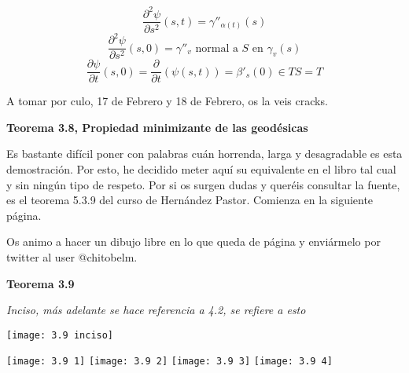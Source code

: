\documentclass[openany]{book}
\begin{document}
\begin{demonstration}
  $$ \dfrac{\partial ^2 \psi}{\partial s^2}(s,t) = \gamma ''_{\alpha (t)}(s)  $$
  $$ \dfrac{\partial ^2 \psi}{\partial s^2}(s,0) = \gamma ''_v \text{ normal a }S \text{ en } \gamma _v(s) $$
  $$ \dfrac{\partial \psi}{\partial t}(s,0) = \dfrac{\partial }{\partial t}\left( \psi(s,t) \right) = \beta '_s(0) \in TS=T   $$

  A tomar por culo, 17 de Febrero y 18 de Febrero, os la veis cracks.
\end{demonstration}

\begin{center}
\textbf{Teorema 3.8, Propiedad minimizante de las geodésicas}
\end{center}

Es bastante difícil poner con palabras cuán horrenda, larga y desagradable es esta demostración. Por esto, he decidido meter aquí su equivalente en el libro tal cual y sin ningún tipo de respeto. Por si os surgen dudas y queréis consultar la fuente, es el teorema 5.3.9 del curso de Hernández Pastor. Comienza en la siguiente página.

Os animo a hacer un dibujo libre en lo que queda de página y enviármelo por twitter al user @chitobelm.




\begin{center}
\textbf{Teorema 3.9}
\end{center}


\begin{center}
\textit{Inciso, más adelante se hace referencia a 4.2, se refiere a esto}
\end{center}
\begin{center}
  \texttt{[image: 3.9 inciso]}
\end{center}
\hspace*{-4cm}\texttt{[image: 3.9 1]}
\newpage
\hspace*{-4cm}\texttt{[image: 3.9 2]}
\hspace*{-4cm}\texttt{[image: 3.9 3]}
\hspace*{-4cm}\texttt{[image: 3.9 4]}
\end{document}
